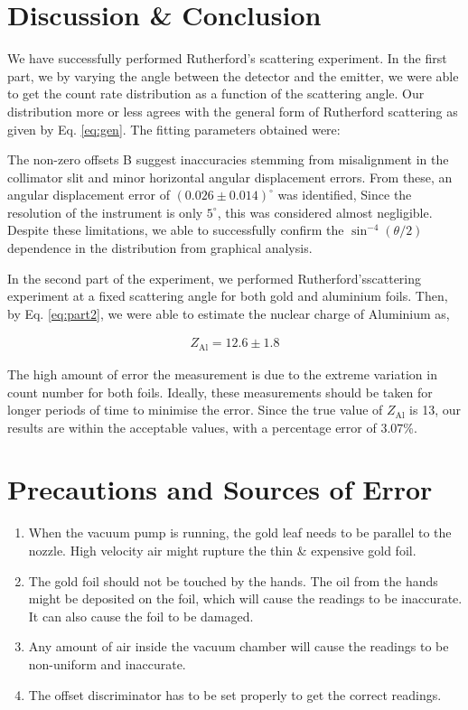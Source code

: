 \section{Discussion \& Conclusion}
We have successfully performed Rutherford's scattering experiment. In the first part, we by varying the angle between the detector and the emitter, we were able to get the count rate distribution as a function of the scattering angle. Our distribution more or less agrees with the general form of Rutherford scattering as given by Eq. \ref{eq:gen}.
The fitting parameters obtained were:


The non-zero offsets B suggest
inaccuracies stemming from misalignment in the collimator slit and minor horizontal angular displacement errors. From these, an angular displacement error of $(0.026 \pm 0.014)^\circ$ was identified, Since the resolution of the instrument is only $5^\circ$, this was considered almost negligible. Despite these limitations, we able to successfully confirm the $\sin^{-4}(\theta/2)$ dependence in the distribution from graphical analysis.

In the second part of the experiment, we performed Rutherford’sscattering experiment at a fixed scattering angle for both gold and aluminium foils. Then, by Eq. \ref{eq:part2}, we were able to estimate the nuclear charge of Aluminium as,

\begin{align*}
    \boxed{Z_\text{Al} = 12.6 \pm 1.8}
\end{align*}

The high amount of error the measurement is due to the extreme variation in count number for both foils. Ideally, these measurements should be taken for longer periods of time to minimise the error. Since the true value of $Z_\text{Al}$ is 13, our results are within the acceptable values, with a percentage error of $3.07$\%.

\section{Precautions and Sources of Error}

    \begin{enumerate}
        \item When the vacuum pump is running, the gold leaf
        needs to be parallel to the nozzle. High velocity air
        might rupture the thin \& expensive gold foil.
        \item  The gold foil should not be touched by the hands.
        The oil from the hands might be deposited on the
        foil, which will cause the readings to be inaccurate.
        It can also cause the foil to be damaged.
        \item Any amount of air inside the vacuum chamber will
        cause the readings to be non-uniform and inaccurate.
        \item The offset discriminator has to be set properly to
        get the correct readings.
    \end{enumerate}

